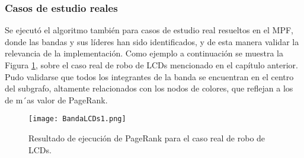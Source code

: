 \subsubsection{Casos de estudio reales}

Se ejecutó el algoritmo también para casos de estudio real resueltos en el MPF, donde las bandas y sus líderes han sido identificados, y de esta manera validar la relevancia de la implementación. Como ejemplo a continuación se muestra la Figura \ref{fig:BandaLCDs1}, sobre el caso real de robo de LCDs mencionado en el capítulo anterior. Pudo validarse que todos los integrantes de la banda se encuentran en el centro del subgrafo, altamente relacionados con los nodos de colores, que reflejan a los de m´as valor de PageRank.

\begin{figure}
	\centering
	\texttt{[image: BandaLCDs1.png]}
	\caption{Resultado de ejecución de PageRank para el caso real de robo de LCDs.} 
	\label{fig:BandaLCDs1}
\end{figure}
